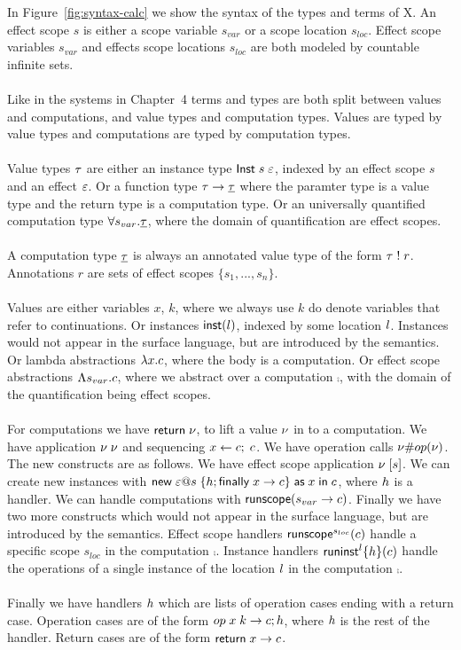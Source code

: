 {In Figure~\ref{fig:syntax-calc} we show the syntax of the types and terms of X.
An effect scope $s$ is either a scope variable $s_{var}$ or a scope location $s_{loc}$.
Effect scope variables $s_{var}$ and effects scope locations $s_{loc}$ are both modeled by countable infinite sets.
\\\\
Like in the systems in Chapter~4 terms and types are both split between values and computations, and value types and computation types.
Values are typed by value types and computations are typed by computation types.
\\\\
Value types $\tau$ are either an instance type $\mathsf{Inst} \; s \; \varepsilon$, indexed by an effect scope $s$ and an effect $\varepsilon$.
Or a function type $\tau \rightarrow \underline{\tau}$ where the paramter type is a value type and the return type is a computation type.
Or an universally quantified computation type $\forall s_{var} . \underline{\tau}$, where the domain of quantification are effect scopes.
\\\\
A computation type $\underline{\tau}$ is always an annotated value type of the form $\tau \; ! \; r$.
Annotations $r$ are sets of effect scopes $\{ s_1, ..., s_n \}$.
\\\\
Values are either variables $x$, $k$, where we always use $k$ do denote variables that refer to continuations.
Or instances $\mathsf{inst}(l)$, indexed by some location $l$.
Instances would not appear in the surface language, but are introduced by the semantics.
Or lambda abstractions $\lambda x . c$, where the body is a computation.
Or effect scope abstractions $\Lambda s_{var} . c$, where we abstract over a computation $\comp$, with the domain of the quantification being effect scopes.
\\\\
For computations we have $\mathsf{return} \; \nu$, to lift a value $\nu$ in to a computation.
We have application $\nu \; \nu$ and sequencing $x \leftarrow c ;\; c$.
We have operation calls $\nu \# op(\nu)$.
The new constructs are as follows.
We have effect scope application $\nu \; [ s ]$.
We can create new instances with $\mathsf{new} \; \varepsilon @ s \; \{ h ; \mathsf{finally} \; x \rightarrow c \} \; \mathsf{as} \; x \;\mathsf{in}\; c$, where $h$ is a handler.
We can handle computations with $\mathsf{runscope} ( s_{var} \rightarrow c )$.
Finally we have two more constructs which would not appear in the surface language, but are introduced by the semantics.
Effect scope handlers $\mathsf{runscope}^{s_{loc}} ( c )$ handle a specific scope $s_{loc}$ in the computation $\comp$.
Instance handlers $\mathsf{runinst}^{l} \{ h \} ( c )$ handle the operations of a single instance of the location $l$ in the computation $\comp$.
\\\\
Finally we have handlers $h$ which are lists of operation cases ending with a return case.
Operation cases are of the form $op \; x \; k \rightarrow c ; h$, where $h$ is the rest of the handler.
Return cases are of the form $\mathsf{return} \; x \rightarrow c$.

}
